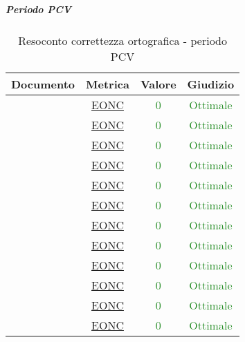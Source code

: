 						\subparagraph{Periodo PCV}
						
						\begin{table}[H]
							\centering
							\small
							\begin{tabular}{c | c | c | c}
								\hline
								\textbf{Documento} & \textbf{Metrica}    & \textbf{Valore} & \textbf{Giudizio} \\ \hline
								\pdpvtre        & \hyperref[MLEC]{EONC}  & \textcolor{ForestGreen}{0} & \textcolor{ForestGreen}{Ottimale} \\
								\pdqvtre        & \hyperref[MLEC]{EONC} &  \textcolor{ForestGreen}{0} & \textcolor{ForestGreen}{Ottimale} \\
								\ndpvtre        & \hyperref[MLEC]{EONC}  & \textcolor{ForestGreen}{0} & \textcolor{ForestGreen}{Ottimale} \\
								\adrvtre        & \hyperref[MLEC]{EONC}   & \textcolor{ForestGreen}{0} & \textcolor{ForestGreen}{Ottimale} \\
								\stvdue		& \hyperref[MLEC]{EONC}  & \textcolor{ForestGreen}{0} & \textcolor{ForestGreen}{Ottimale} \\
								\glvdue        & \hyperref[MLEC]{EONC}  & \textcolor{ForestGreen}{0} & \textcolor{ForestGreen}{Ottimale} \\
								\ddpvuno        & \hyperref[MLEC]{EONC}  & \textcolor{ForestGreen}{0} & \textcolor{ForestGreen}{Ottimale} \\
								\manutvuno        & \hyperref[MLEC]{EONC}  & \textcolor{ForestGreen}{0} & \textcolor{ForestGreen}{Ottimale} \\
								\manmanvuno        & \hyperref[MLEC]{EONC}  & \textcolor{ForestGreen}{0} & \textcolor{ForestGreen}{Ottimale} \\
								\vsesettei       & \hyperref[MLEC]{EONC} & \textcolor{ForestGreen}{0} & \textcolor{ForestGreen}{Ottimale} \\
								\vottoi       & \hyperref[MLEC]{EONC}  & \textcolor{ForestGreen}{0} & \textcolor{ForestGreen}{Ottimale} \\
								\vquattroe       & \hyperref[MLEC]{EONC} & \textcolor{ForestGreen}{0} & \textcolor{ForestGreen}{Ottimale} \\
							\end{tabular}
							\caption{Resoconto correttezza ortografica - periodo PCV}
							\label{tab_resoconto_correttezza_ortografica_PCV}
						\end{table}
						
